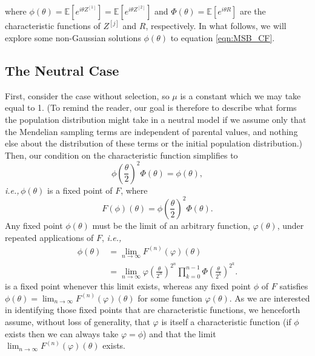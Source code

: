 \documentclass{article}
\newcommand{\ie}{\textit{i.e.,}\,}
\newcommand{\1}{\mathbbm{1}}
\theoremstyle{remark}
\theoremstyle{definition}
\begin{document}
where
$ \phi(\theta) = \mathbb{E}\left[e^{i\theta Z^{[1]}}\right] = \mathbb{E}\left[e^{i\theta Z^{[2]}}\right] $
and
$ \Phi(\theta) = \mathbb{E}\left[e^{i\theta R}\right] $
are the characteristic functions of $Z^{[j]}$ and $R$, respectively. 
In what follows, we will explore some non-Gaussian solutions $\phi(\theta)$ to equation \eqref{eqn:MSB_CF}.


\subsection{The Neutral Case}

First, consider the case without selection, so $\mu$ is a constant
which we may take equal to 1. 
(To remind the reader, our goal is therefore to describe 
what forms the population distribution might take in a neutral model
if we assume only that the Mendelian sampling terms are independent of parental values,
and nothing else about the distribution of these terms or the initial population distribution.) 
Then, our condition on the characteristic function simplifies to
\begin{equation}\label{eq:CF_neutral}
	{\textstyle \phi\left(\frac{\theta}{2}\right)^{2}} \Phi(\theta) %
	= \phi(\theta) ,
\end{equation}
\ie $\phi(\theta)$ is a fixed point of $F$, where
 \[
	F(\phi)(\theta) = {\textstyle \phi\left(\frac{\theta}{2}\right)^{2}} \Phi(\theta) .
\]
Any fixed point $\phi(\theta)$ must be the limit of an arbitrary function, $\varphi(\theta)$, under repeated applications of $F$,
\ie {}
\begin{equation}\label{eq:fpeq}
\begin{aligned}
	\phi(\theta) 
    &= \lim_{n \to \infty} F^{(n)}(\varphi)(\theta) \\
    &= \lim_{n \to \infty} \varphi\left(\frac{\theta}{2^{n}}\right)^{2^{n}}\prod_{k=0}^{n-1}\Phi\left(\frac{\theta}{2^{k}}\right)^{2^{k}} .
\end{aligned}
\end{equation}
is a fixed point whenever this limit exists,
whereas any fixed point $\phi$ of $F$ satisfies  $\phi(\theta) = \lim_{n \to \infty} F^{(n)}(\varphi)(\theta)$
for some function $\varphi(\theta)$.
As we are interested in identifying those fixed points that are characteristic functions, we henceforth assume, without loss of generality, that $\varphi$ is itself a characteristic function (if $\phi$ exists then we can always take $\varphi = \phi$) and that the limit $\lim_{n \to \infty} F^{(n)}(\varphi)(\theta)$ exists.
\end{document}
